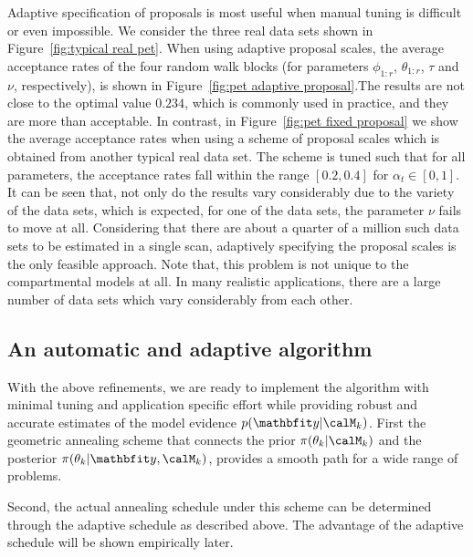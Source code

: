 Adaptive specification of proposals is most useful when manual tuning is
difficult or even impossible. We consider the three real \pet data sets shown
in Figure~\ref{fig:typical real pet}. When using adaptive proposal scales, the
average acceptance rates of the four random walk blocks (for parameters
$\phi_{1:r}$, $\theta_{1:r}$, $\tau$ and $\nu$, respectively), is shown in
Figure~\ref{fig:pet adaptive proposal}.The results are not close to the
optimal value $0.234$, which is commonly used in practice, and they are more
than acceptable. In contrast, in Figure~\ref{fig:pet fixed proposal} we show
the average acceptance rates when using a scheme of proposal scales which is
obtained from another typical real \pet data set. The scheme is tuned such
that for all parameters, the acceptance rates fall within the range $[0.2,
0.4]$ for $\alpha_t \in [0, 1]$. It can be seen that, not only do the results
vary considerably due to the variety of the data sets, which is expected, for
one of the data sets, the parameter $\nu$ fails to move at all. Considering
that there are about a quarter of a million such data sets to be estimated in
a single \pet scan, adaptively specifying the proposal scales is the only
feasible approach. Note that, this problem is not unique to the \pet
compartmental models at all. In many realistic applications, there are a large
number of data sets which vary considerably from each other.

\subsection{An automatic and adaptive algorithm}
\label{sub:An automatic and adaptive algorithm}

With the above refinements, we are ready to implement the \smc[2] algorithm
with minimal tuning and application specific effort while providing robust and
accurate estimates of the model evidence $p(\data|\calM_k)$. First the
geometric annealing scheme that connects the prior $\pi(\theta_k|\calM_k)$ and
the posterior $\pi(\theta_k|\data,\calM_k)$, provides a smooth path for a wide
range of problems.

Second, the actual annealing schedule under this scheme can be determined
through the adaptive schedule as described above. The advantage of the
adaptive schedule will be shown empirically later.

